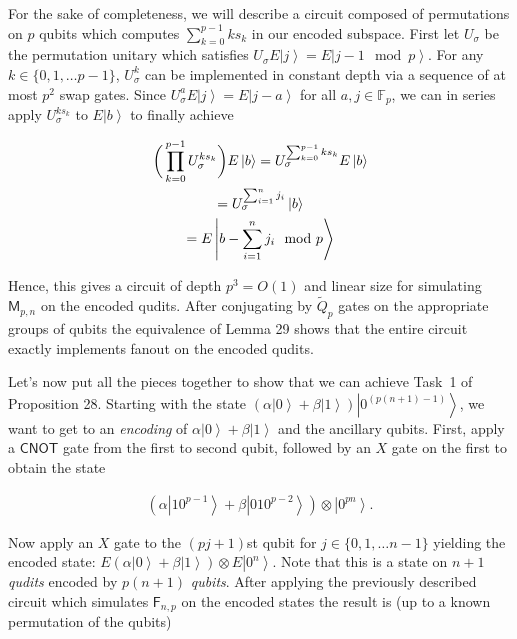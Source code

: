 For the sake of completeness, we will describe a circuit composed of permutations on $p$ qubits which computes $\sum_{k=0}^{p-1}ks_{k}$ in our encoded subspace. First let $U_{\sigma}$ be the permutation unitary which satisfies $U_{\sigma}E\left|j\right\rangle=E\left|j-1\mod{p}\right\rangle$. For any $k\in\{0,1,\dots p-1\}$, $U_{\sigma}^{k}$ can be implemented in constant depth via a sequence of at most $p^{2}$ swap gates. Since $U_{\sigma}^{a}E\left|j\right\rangle=E\left|j-a\right\rangle$ for all $a,j\in\mathbb{F}_{p}$, we can in series apply $U_{\sigma}^{ks_{k}}$ to $E\left|b\right\rangle$ to finally achieve\par




\[\begin{gathered}
\displaystyle\bigg{(}\prod_{k=0}^{p-1}U_{\sigma}^{ks_{k}}\bigg{)}E\left|b\right\rangle \displaystyle=U_{\sigma}^{\sum_{k=0}^{p-1}ks_{k}}E\left|b\right\rangle \\
\displaystyle=U_{\sigma}^{\sum_{i=1}^{n}j_{i}}\left|b\right\rangle \\
\displaystyle=E\left|b-\sum_{i=1}^{n}j_{i}\mod{p}\right\rangle
\end{gathered}\]


Hence, this gives a circuit of depth $p^{3}=O(1)$ and linear size for simulating $\mathsf{M}_{p,n}$ on the encoded qudits. After conjugating by $\tilde{Q}_{p}$ gates on the appropriate groups of qubits the equivalence of Lemma 29 shows that the entire circuit exactly implements fanout on the encoded qudits.\par




Let’s now put all the pieces together to show that we can achieve Task 1 of Proposition 28. Starting with the state $(\alpha\left|0\right\rangle+\beta\left|1\right\rangle)\left|0^{(p(n+1)-1)}\right\rangle$, we want to get to an \emph{encoding} of $\alpha\left|0\right\rangle+\beta\left|1\right\rangle$ and the ancillary qubits. First, apply a $\mathsf{CNOT}$ gate from the first to second qubit, followed by an $X$ gate on the first to obtain the state\par


\[\begin{gathered}
\displaystyle(\alpha\left|10^{p-1}\right\rangle+\beta\left|010^{p-2}\right\rangle)\otimes\left|0^{pn}\right\rangle.
\end{gathered}\]


Now apply an $X$ gate to the $(pj+1)$st qubit for $j\in\{0,1,\dots n-1\}$ yielding the encoded state: $E(\alpha\left|0\right\rangle+\beta\left|1\right\rangle)\otimes E\left|0^{n}\right\rangle$. Note that this is a state on $n+1$ \emph{qudits} encoded by $p(n+1)$ \emph{qubits}. After applying the previously described circuit which simulates $\mathsf{F}_{n,p}$ on the encoded states the result is (up to a known permutation of the qubits)\par



